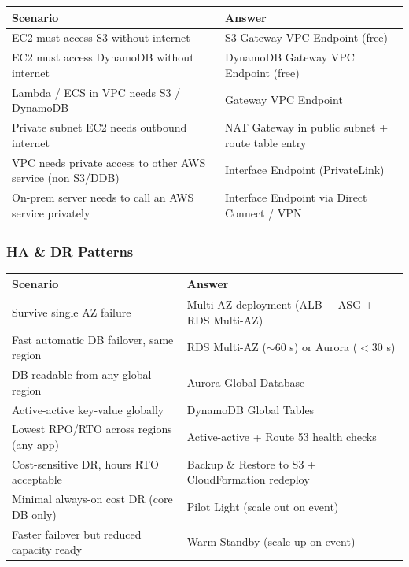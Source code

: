 \begin{comparebox}[title={Private connectivity scenarios}]
\begin{tabular}{@{}p{6cm}p{5.5cm}@{}}
\toprule
\textbf{Scenario} & \textbf{Answer} \\
\midrule
EC2 must access S3 without internet          & S3 Gateway VPC Endpoint (free) \\[3pt]
EC2 must access DynamoDB without internet    & DynamoDB Gateway VPC Endpoint (free) \\[3pt]
Lambda / ECS in VPC needs S3 / DynamoDB     & Gateway VPC Endpoint \\[3pt]
Private subnet EC2 needs outbound internet   & NAT Gateway in public subnet + route table entry \\[3pt]
VPC needs private access to other AWS service (non S3/DDB) & Interface Endpoint (PrivateLink) \\[3pt]
On-prem server needs to call an AWS service privately & Interface Endpoint via Direct Connect / VPN \\[3pt]
\bottomrule
\end{tabular}
\end{comparebox}

\subsubsection{HA \& DR Patterns}

\begin{comparebox}[title={High availability and disaster recovery}]
\begin{tabular}{@{}p{6cm}p{5.5cm}@{}}
\toprule
\textbf{Scenario} & \textbf{Answer} \\
\midrule
Survive single AZ failure                       & Multi-AZ deployment (ALB + ASG + RDS Multi-AZ) \\[3pt]
Fast automatic DB failover, same region         & RDS Multi-AZ ($\sim$60 s) or Aurora ($<$30 s) \\[3pt]
DB readable from any global region              & Aurora Global Database \\[3pt]
Active-active key-value globally                & DynamoDB Global Tables \\[3pt]
Lowest RPO/RTO across regions (any app)         & Active-active + Route 53 health checks \\[3pt]
Cost-sensitive DR, hours RTO acceptable         & Backup \& Restore to S3 + CloudFormation redeploy \\[3pt]
Minimal always-on cost DR (core DB only)        & Pilot Light (scale out on event) \\[3pt]
Faster failover but reduced capacity ready      & Warm Standby (scale up on event) \\[3pt]
\bottomrule
\end{tabular}
\end{comparebox}

